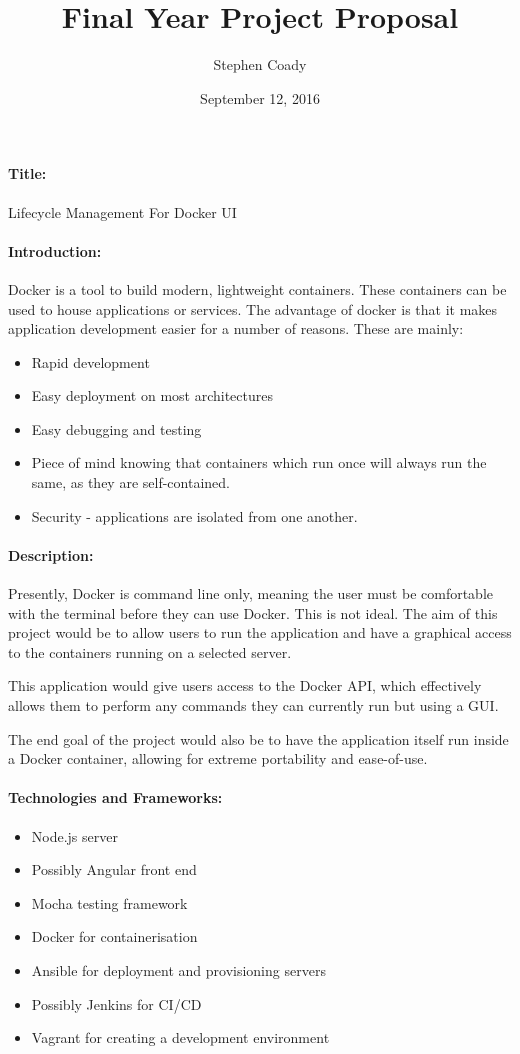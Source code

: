 \documentclass{article}
\author{Stephen Coady}
\title{Final Year Project Proposal}
\date{September 12, 2016}
\begin{document}


\newpage

\paragraph{Title:}
\label{par:Title}
Lifecycle Management For Docker UI

\paragraph{Introduction:}
\label{par:Introduction}
Docker is a tool to build modern, lightweight containers. These containers can be used to house applications or services. The advantage of docker is that it makes application development easier for a number of reasons. These are mainly:

\begin{itemize}
  \item Rapid development
  \item Easy deployment on most architectures
  \item Easy debugging and testing
  \item Piece of mind knowing that containers which run once will always run the same, as they are self-contained.
  \item Security - applications are isolated from one another.
\end{itemize}

\paragraph{Description:}
\label{par:Description}
Presently, Docker is command line only, meaning the user must be comfortable with the terminal before they can use Docker. This is not ideal. The aim of this project would be to allow users to run the application and have a graphical access to the containers running on a selected server.

This application would give users access to the Docker API, which effectively allows them to perform any commands they can currently run but using a GUI.

The end goal of the project would also be to have the application itself run inside a Docker container, allowing for extreme portability and ease-of-use.

\paragraph{Technologies and Frameworks:}
\label{par:Technologies and Frameworks}
\begin{itemize}
	\item Node.js server
	\item Possibly Angular front end
	\item Mocha testing framework
  \item Docker for containerisation
  \item Ansible for deployment and provisioning servers
  \item Possibly Jenkins for CI/CD
  \item Vagrant for creating a development environment
\end{itemize}
\end{document}

